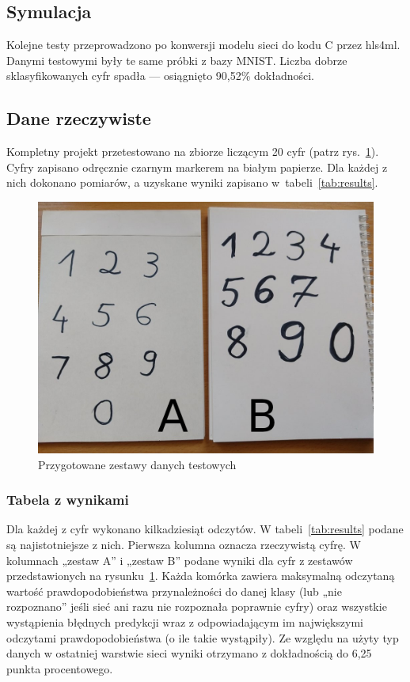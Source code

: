 \documentclass[12pt, oneside, a4paper]{article}
\def\CPP{{C\nolinebreak[4]\hspace{-.05em}\raisebox{.4ex}{\tiny\bf ++}}}
\begin{document}
\subsection{Symulacja}
Kolejne testy przeprowadzono po konwersji modelu sieci do kodu \CPP{}
przez hls4ml. Danymi testowymi były te same próbki z bazy MNIST.
Liczba dobrze sklasyfikowanych cyfr spadła --- osiągnięto 90,52\%
dokładności.

\subsection{Dane rzeczywiste}
Kompletny projekt przetestowano na zbiorze liczącym 20 cyfr (patrz
rys.~\ref{fig:test_data}). Cyfry
zapisano odręcznie czarnym markerem na białym papierze. Dla każdej z nich
dokonano pomiarów, a uzyskane wyniki zapisano w~tabeli~\ref{tab:results}.

\begin{figure}[h]
  \centering
  \includegraphics[width=0.9\linewidth]{figures/test_data.jpg}
  \caption{Przygotowane zestawy danych testowych}\label{fig:test_data}
\end{figure}


\subsubsection{Tabela z wynikami}
Dla każdej z cyfr wykonano kilkadziesiąt odczytów. W tabeli~\ref{tab:results}
podane są najistotniejsze z nich.
Pierwsza kolumna oznacza rzeczywistą cyfrę. W kolumnach „zestaw A” i „zestaw B”
podane wyniki dla cyfr z zestawów przedstawionych
na rysunku~\ref{fig:test_data}.
Każda komórka zawiera maksymalną odczytaną wartość prawdopodobieństwa
przynależności do danej klasy (lub „nie rozpoznano” jeśli sieć ani razu
nie rozpoznała poprawnie cyfry)
oraz wszystkie wystąpienia błędnych predykcji wraz z odpowiadającym im
największymi odczytami prawdopodobieństwa (o ile takie wystąpiły).
Ze względu na użyty typ danych w ostatniej warstwie sieci
wyniki otrzymano z dokładnością do 6,25 punkta procentowego.
\end{document}
